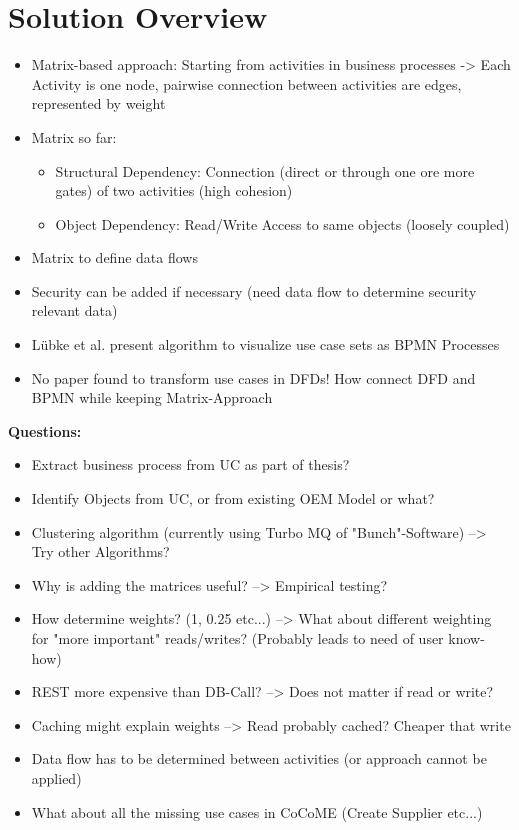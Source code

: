 \chapter{Solution Overview}
\label{ch:SolutionOverview}
\begin{itemize}
	\item Matrix-based approach: Starting from activities in business processes -> Each Activity is one node, pairwise connection between activities are edges, represented by weight
	
	\item Matrix so far: 
	\begin{itemize}
		\item Structural Dependency: Connection (direct or through one ore more gates) of two activities (high cohesion)
		\item Object Dependency: Read/Write Access to same objects (loosely coupled)

	\end{itemize} 

	\item Matrix to define data flows
	\item Security can be added if necessary (need data flow to determine security relevant data)
	\item Lübke et al. present algorithm to visualize use case sets as BPMN Processes
	\item No paper found to transform use cases in DFDs! How connect DFD and BPMN while keeping Matrix-Approach
\end{itemize}

\vspace{2cm}
\textbf{Questions:}
\begin{itemize}
	\item Extract business process from UC as part of thesis?
	\item Identify Objects from UC, or from existing OEM Model or what?
	\item Clustering algorithm (currently using Turbo MQ of "Bunch"-Software) --> Try other Algorithms?
	\item Why is adding the matrices useful? --> Empirical testing?
	\item How determine weights? (1,  0.25 etc...) --> What about different weighting for "more important" reads/writes? (Probably leads to need of user know-how)
	\item REST more expensive than DB-Call? --> Does not matter if read or write?
	\item Caching might explain weights --> Read probably cached? Cheaper that write
	\item Data flow has to be determined between activities (or approach cannot be applied)
	\item What about all the missing use cases in CoCoME (Create Supplier etc...)
	
\end{itemize}